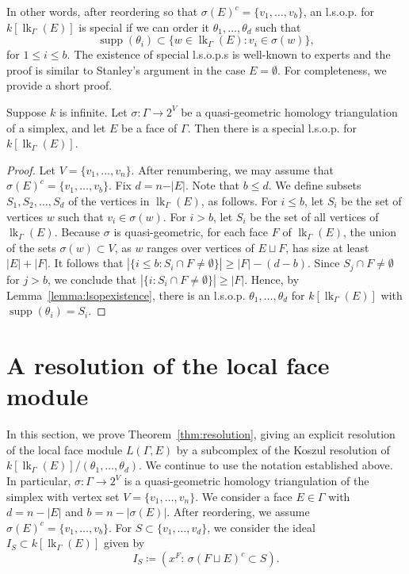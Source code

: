 \documentclass[ALCO, Unicode,published]{cedram}
\DeclareMathOperator{\lk}{lk}
\DeclareMathOperator{\supp}{supp}
\begin{document}
In other words, after reordering so that $\sigma(E)^c = \{v_1, \ldots, v_b\}$, an l.s.o.p. for $k[\lk_\Gamma(E)]$ is special if we can order it $\theta_1, \ldots, \theta_d$ such that
\[
\supp(\theta_i) \subset \{ w \in \lk_\Gamma(E) : v_i \in \sigma(w)\},
\]
for $1 \leq i \leq b$.  The existence of special l.s.o.p.s is well-known to experts and the proof is similar to Stanley's argument in the case $E = \emptyset$. For completeness, we provide a short proof.

\begin{proposition} \label{prop:speciallsopexistence}
Suppose $k$ is infinite. Let $\sigma\colon \Gamma \to 2^V$ be a quasi-geometric homology triangulation of a simplex, and let $E$ be a face of $\Gamma$. Then there is a special l.s.o.p. for $k[\lk_{\Gamma}(E)]$.
\end{proposition}
\begin{proof}

Let $V = \{v_1, \ldots, v_n\}$.  After renumbering, we may assume that $\sigma(E)^c = \{v_1, \dotsc, v_b\}$. Fix $d = n - \vert E \vert$. Note that $b \leq d$.  We define subsets $S_1, S_2, \dotsc, S_{d}$ of the vertices in $\lk_{\Gamma}(E)$, as follows. For $i \le b$, let $S_i$ be the set of vertices $w$ such that $v_i \in \sigma(w)$. 
For $i > b$, let $S_i$ be the set of all vertices of $\lk_{\Gamma}(E)$. Because $\sigma$ is quasi-geometric, for each face $F$ of $\lk_{\Gamma}(E)$, the union of the sets $\sigma(w) \subset V$, as $w$ ranges over vertices of $E \sqcup F$, has size at least $|E| + |F|$.  It follows that $|\{i \leq b : S_i \cap F \neq \emptyset \}| \geq |F| - (d-b)$.  Since $S_j \cap F \neq \emptyset$ for $j > b$, we conclude that $|\{i : S_i \cap F \neq \emptyset \}| \geq |F|$.  Hence, by Lemma~\ref{lemma:lsopexistence}, there is an l.s.o.p. $\theta_1, \ldots, \theta_d$ for $k[\lk_\Gamma(E)]$ with $\supp(\theta_i) = S_i$. 
\end{proof}


\section{A resolution of the local face module}

In this section, we prove Theorem~\ref{thm:resolution}, giving an explicit resolution of the local face module $L(\Gamma,E)$ by a subcomplex of the Koszul resolution of $k[\lk_{\Gamma}(E)]/(\theta_1, \dotsc, \theta_{d})$.  We continue to use the notation established above.  In particular, $\sigma\colon \Gamma \to 2^V$ is a quasi-geometric homology triangulation of the simplex with vertex set $V = \{v_1, \ldots, v_n\}$. We consider a face $E \in \Gamma$ with $d = n - |E|$ and $b = n - |\sigma(E)|$.  After reordering, we assume $\sigma(E)^c = \{v_{1}, \dotsc, v_{b}\}$. For $S \subset \{v_1, \ldots, v_d\}$, 
we consider the ideal $I_S \subset k[\lk_\Gamma(E)]$ given by
\begin{equation*}
I_S  \coloneqq  ( x^F : \, \sigma(F \sqcup E)^c \subset S).  
\end{equation*}
\end{document}
